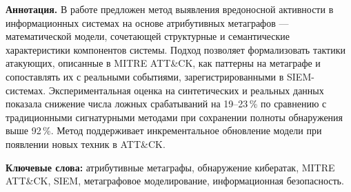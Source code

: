 \vspace{0.5em}
\textbf{Аннотация.} В работе предложен метод выявления вредоносной активности в информационных системах на основе атрибутивных метаграфов — математической модели, сочетающей структурные и семантические характеристики компонентов системы. Подход позволяет формализовать тактики атакующих, описанные в MITRE ATT\&CK, как паттерны на метаграфе и сопоставлять их с реальными событиями, зарегистрированными в SIEM-системах. Экспериментальная оценка на синтетических и реальных данных показала снижение числа ложных срабатываний на 19–23\,\% по сравнению с традиционными сигнатурными методами при сохранении полноты обнаружения выше 92\,\%. Метод поддерживает инкрементальное обновление модели при появлении новых техник в ATT\&CK.

\vspace{0.5em}
\textbf{Ключевые слова:} атрибутивные метаграфы, обнаружение кибератак, MITRE ATT\&CK, SIEM, метаграфовое моделирование, информационная безопасность.
\vspace{1em}